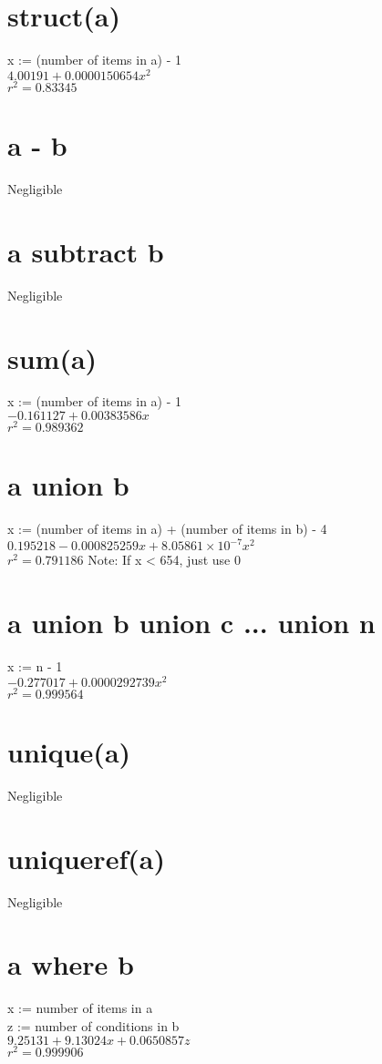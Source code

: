 \documentclass[12pt]{article}
\begin{document}
	\section{struct(a)}
	x := (number of items in a) - 1\\
	$4.00191 + 0.0000150654 x^2$\\
	$r^2 = 0.83345$
	
	\section{a - b}
	Negligible
	
	\section{a subtract b}
	Negligible
	
	\section{sum(a)}
	x := (number of items in a) - 1\\
	$-0.161127 + 0.00383586 x$\\
	$r^2 = 0.989362$
	
	\section{a union b}
	x := (number of items in a) + (number of items in b) - 4\\
	$0.195218 - 0.000825259 x + 8.05861 \times 10^{-7} x^2$\\
	$r^2 = 0.791186$
	Note: If x < 654, just use 0
	
	\section{a union b union c ... union n}
	x := n - 1\\
	$-0.277017 + 0.0000292739 x^2$\\
	$r^2 = 0.999564$
	
	\section{unique(a)}
	Negligible
	
	\section{uniqueref(a)}
	Negligible
	
	\section{a where b}
	x := number of items in a\\
	z := number of conditions in b\\
	$9.25131 + 9.13024 x + 0.0650857 z$\\
	$r^2 = 0.999906$
	
\end{document}
